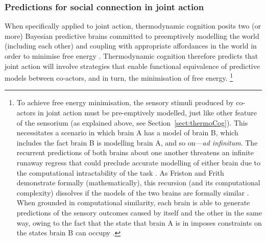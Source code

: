 \begin{CJK}{UTF8}{gbsn}
\subsubsection{Predictions for social connection in joint action}
When specifically applied to joint action, thermodynamic cognition posits two (or more) Bayesian predictive brains committed to preemptively modelling the world (including each other) and coupling with appropriate affordances in the world in order to minimise free energy \citep{Moutoussis2014,Friston2015,Friston2015a}.  Thermodynamic cognition therefore predicts that joint action will involve strategies that enable functional equivalence of predictive models between co-actors, and in turn, the minimisation of free energy.
        \footnote{
        To achieve free energy minimisation, the sensory stimuli produced by co-actors in joint action must be pre-emptively modelled, just like other feature of the sensorium (as explained above, see Section~\ref{sect:thermoCog}).  This necessitates a scenario in which brain A has a model of brain B, which includes the fact brain B is modelling brain A, and so on---\textit{ad infinitum}.  The recurrent predictions of both brains about one another threatens an infinite runaway regress that could preclude accurate modelling of either brain due to the computational intractability of the task \citep{Moutoussis2014,Friston2015}.  As Friston and Frith demonstrate formally (mathematically), this recursion (and its computational complexity) dissolves if the models of the two brains are formally similar \citep{Friston2015,Friston2015a}.
        When grounded in computational similarity, each brain is able to generate predictions of the sensory outcomes caused by itself and the other in the same way, owing to the fact that the state that brain A is in imposes constraints on the states brain B can occupy \citep{Richardson2015}.
        }


\end{CJK}
